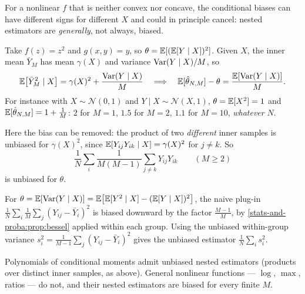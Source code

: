 \begin{notechapter}
For a nonlinear $f$ that is neither convex nor concave, the conditional biases can
have different signs for different $X$ and could in principle cancel: nested
estimators are \emph{generally}, not always, biased.

\begin{example}\label{monte-carlo:ex:square}
Take $f(z) = z^2$ and $g(x,y) = y$, so $\theta = \mathbb{E}[(\mathbb{E}[Y\mid X])^2]$. Given $X$,
the inner mean $\bar Y_M$ has mean $\gamma(X)$ and variance $\operatorname{Var}(Y\mid X)/M$, so
\[
  \mathbb{E}\bigl[\bar Y_M^2\mid X\bigr] = \gamma(X)^2 + \frac{\operatorname{Var}(Y\mid X)}M
  \quad\Longrightarrow\quad
  \mathbb{E}[\hat\theta_{N,M}] - \theta = \frac{\mathbb{E}[\operatorname{Var}(Y\mid X)]}{M} .
\]
For instance with $X\sim\mathcal N(0,1)$ and $Y\mid X\sim\mathcal N(X,1)$, $\theta = \mathbb{E}[X^2] = 1$
and $\mathbb{E}[\hat\theta_{N,M}] = 1 + \frac1M$: $2$ for $M = 1$, $1.5$ for $M = 2$, $1.1$
for $M = 10$, \emph{whatever} $N$.

Here the bias can be removed: the product of two \emph{different} inner samples
is unbiased for $\gamma(X)^2$, since $\mathbb{E}[Y_{ij}Y_{ik}\mid X] = \gamma(X)^2$ for
$j\neq k$. So
\[
  \frac1N\sum_i\frac1{M(M-1)}\sum_{j\neq k}Y_{ij}Y_{ik}\qquad(M\geq2)
\]
is unbiased for $\theta$.
\end{example}

\begin{example}
For $\theta = \mathbb{E}[\operatorname{Var}(Y\mid X)] = \mathbb{E}\bigl[\mathbb{E}[Y^2\mid X] - (\mathbb{E}[Y\mid X])^2\bigr]$, the
naive plug-in $\frac1N\sum_i\frac1M\sum_j(Y_{ij} - \bar Y_i)^2$ is biased downward by
the factor $\frac{M-1}M$, by \cref{stats-and-proba:prop:bessel} applied within
each group. Using the unbiased within-group variance
$s_i^2 = \frac1{M-1}\sum_j(Y_{ij} - \bar Y_i)^2$ gives the unbiased estimator
$\frac1N\sum_is_i^2$.
\end{example}

\begin{keyidea}
Polynomials of conditional moments admit unbiased nested estimators (products
over distinct inner samples, as above). General nonlinear functions --- $\log$,
$\max$, ratios --- do not, and their nested estimators are biased for every
finite $M$.
\end{keyidea}


\end{notechapter}
